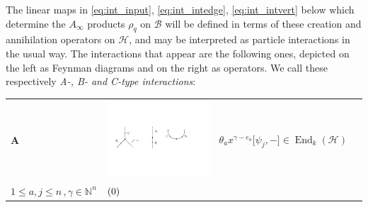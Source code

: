 \documentclass[english,letter paper,12pt,leqno]{article}
\newcommand{\tagarray}{\mbox{}\refstepcounter{equation}$(\theequation)$}
\theoremstyle{example}
\numberwithin{equation}{section}
\DeclareMathOperator{\End}{End}
\begin{document}
The linear maps in \eqref{eq:int_input}, \eqref{eq:int_intedge}, \eqref{eq:int_intvert} below which determine the $A_\infty$ products $\rho_q$ on $\mathscr{B}$ will be defined in terms of these creation and annihilation operators on $\mathscr{H}$, and may be interpreted as particle interactions in the usual way. The interactions that appear are the following ones, depicted on the left as Feynman diagrams and on the right as operators. We call these respectively \emph{A-, B- and C-type interactions}:

\begin{center}
\begin{tabular}{ >{\centering}m{1cm} >{\centering}m{4cm} >{\centering}m{8cm} >{\centering}m{1cm}}
\textbf{A}
&
\includegraphics[scale=0.4]{dia2}
&
$\theta_a x^{\gamma - e_a} \big[\psi_j, -\big] \in \End_k( \mathscr{H} )$\\
\vspace{0.5cm}
$1 \le a,j \le n\,, \gamma \in \mathbb{N}^n$
&
\tagarray{\label{interaction_1}}
\end{tabular}
\end{center}
\end{document}
